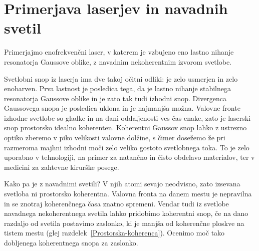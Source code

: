 \section{Primerjava laserjev in navadnih svetil}
Primerjajmo enofrekvenčni laser, v katerem je vzbujeno eno lastno nihanje
resonatorja Gaussove oblike, z navadnim nekoherentnim izvorom svetlobe.

Svetlobni snop iz laserja ima dve takoj očitni odliki: je zelo
usmerjen in zelo enobarven. Prva lastnost je posledica tega, da je
lastno nihanje stabilnega resonatorja Gaussove oblike in je zato tak tudi
izhodni snop. Divergenca Gaussovega snopa je posledica uklona in je 
najmanjša možna. Valovne fronte izhodne svetlobe so gladke in na dani oddaljenosti ves 
čas enake, zato je laserski snop prostorsko idealno koherenten. 
Koherentni Gaussov snop lahko z ustrezno optiko zberemo v piko velikosti
valovne dolžine, s čimer dosežemo že pri razmeroma majhni izhodni moči zelo veliko
gostoto svetlobnega toka. To je zelo uporabno v tehnologiji, na primer za natančno in
čisto obdelavo materialov, ter v medicini za
zahtevne kirurške posege.

Kako pa je z navadnimi svetili? V njih atomi sevajo neodvisno, zato
izsevana svetloba ni prostorsko koherentna. Valovna fronta na danem 
mestu je nepravilna in se znotraj koherenčnega časa znatno spremeni. 
Vendar tudi iz svetlobe navadnega nekoherentnega svetila lahko pridobimo
koherentni snop, če na dano razdaljo od svetila postavimo zaslonko, ki
je manjša od koherenčne ploskve na tistem mestu (glej 
razdelek~\ref{Prostorska-koherenca}). Ocenimo moč tako dobljenega
koherentnega snopa za zaslonko.

